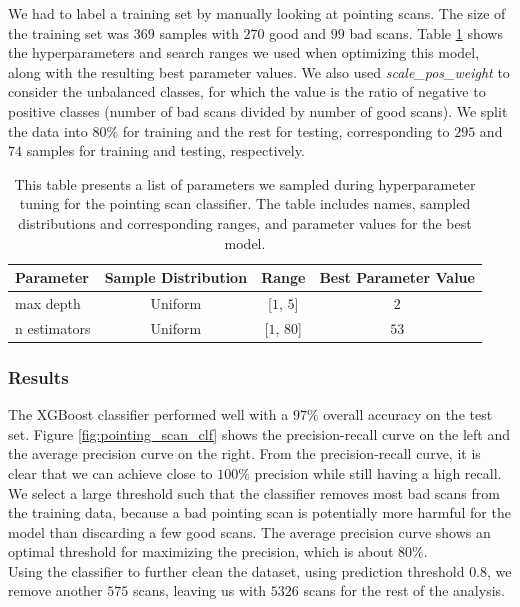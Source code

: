 We had to label a training set by manually looking at pointing scans.
The size of the training set was $369$ samples with $270$ good and $99$ bad scans.
Table \ref{tab:xgb_hyperparameters_clf} shows the hyperparameters and search ranges we used when optimizing this model, along with the resulting best parameter values.
We also used \textit{scale\_pos\_weight} to consider the unbalanced classes, for which the value is the ratio of negative to positive classes (number of bad scans divided by number of good scans).
We split the data into $80\%$ for training and the rest for testing, corresponding to $295$ and $74$ samples for training and testing, respectively.

\begin{table}[H]
    \centering
    \caption{This table presents a list of parameters we sampled during hyperparameter tuning for the pointing scan classifier.
    The table includes names, sampled distributions and corresponding ranges, and parameter values for the best model.}
    \begin{tabular}{lccc}
        \toprule
        Parameter & Sample Distribution & Range & Best Parameter Value\\ \hline
        max depth & Uniform & [$1$, $5$] & $2$\\ 
        n estimators & Uniform & [$1$, $80$] & $53$\\ 
        \bottomrule
    \end{tabular}
    \label{tab:xgb_hyperparameters_clf}
\end{table}

\subsubsection{Results}
The XGBoost classifier performed well with a $97\%$ overall accuracy on the test set.
Figure \ref{fig:pointing_scan_clf} shows the precision-recall curve on the left and the average precision curve on the right.
From the precision-recall curve, it is clear that we can achieve close to $100\%$ precision while still having a high recall.
We select a large threshold such that the classifier removes most bad scans from the training data,
because a bad pointing scan is potentially more harmful for the model than discarding a few good scans.
The average precision curve shows an optimal threshold for maximizing the precision, which is about $80\%$.\\

Using the classifier to further clean the dataset, using prediction threshold $0.8$, we remove another $575$ scans, leaving us with
$5326$ scans for the rest of the analysis.



